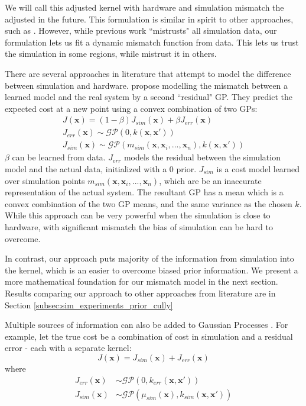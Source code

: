 We will call this adjusted kernel with hardware and simulation mismatch the adjusted \dogkernel in the future.
This formulation is similar in spirit to other approaches, such as \cite{marco2017virtual}. However, while previous work ``mistrusts" all simulation data, our formulation lets us fit a dynamic mismatch function from data. This lets us trust the simulation in some regions, while mistrust it in others.

There are several approaches in literature that attempt to model the difference between simulation and hardware. \cite{wilson2014using} propose modelling the mismatch between a learned model and the real system by a second ``residual" GP. They predict the expected cost at a new point using a convex combination of two GPs:  
\begin{align}
    J(\pmb{x}) = (1-\beta) J_{sim}(\pmb{x}) + \beta J_{err}(\pmb{x}) \\
    J_{err}(\pmb{x}) \sim \mathcal{GP}(0, k(\pmb{x},\pmb{x}')) \\ 
    J_{sim}(\pmb{x}) \sim \mathcal{GP}(m_{sim}(\pmb{x},\pmb{x}_i,...,\pmb{x}_n), k(\pmb{x},\pmb{x}'))
\end{align}
$\beta$ can be learned from data. $J_{err}$ models the residual between the simulation model and the actual data, initialized with a 0 prior. $J_{sim}$ is a cost model learned over simulation points $m_{sim}(\pmb{x},\pmb{x}_i,...,\pmb{x}_n)$, which are be an inaccurate representation of the actual system. The resultant GP has a mean which is a convex combination of the two GP means, and the same variance as the chosen $k$. While this approach can be very powerful when the simulation is close to hardware, with significant mismatch the bias of simulation can be hard to overcome.

In contrast, our approach puts majority of the information from simulation into the kernel, which is an easier to overcome biased prior information. We present a more mathematical foundation for our mismatch model in the next section. Results comparing our approach to other approaches from literature are in Section \ref{subsec:sim_experiments_prior_cully}


Multiple sources of information can also be added to Gaussian Processes \citep{poloczek2016multi}. For example, let the true cost be a combination of cost in simulation and a residual error - each with a separate kernel:
\begin{equation}
    J(\pmb{x}) = J_{sim}(\pmb{x}) + J_{err}(\pmb{x})
\end{equation}
where
\begin{align}
     J_{err}(\pmb{x}) &\sim \mathcal{GP}(0, k_{err}(\pmb{x},\pmb{x}')) \\
J_{sim}(\pmb{x}) &\sim \mathcal{GP}(\mu_{sim}(\pmb{x}), k_{sim}(\pmb{x},\pmb{x}'))
\end{align}

